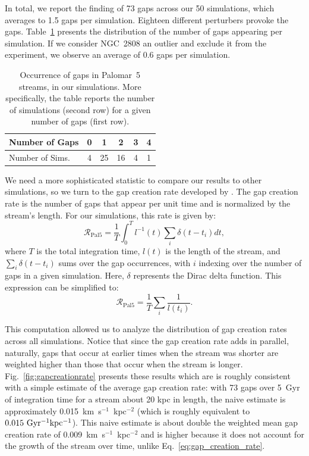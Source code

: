         In total, we report the finding of 73 gaps across our 50 simulations, which averages to 1.5 gaps per simulation. Eighteen different perturbers provoke the gaps. Table~\ref{table:gap_distribution} presents the distribution of the number of gaps appearing per simulation. If we consider NGC~2808 an outlier and exclude it from the experiment, we observe an average of 0.6 gaps per simulation.  

        \begin{table}[h]
            \centering
            \caption[Occurrence of gaps in Palomar~5 streams, in our simulations]{Occurrence of gaps in Palomar~5 streams, in our simulations. More specifically, the table reports the number of simulations (second row) for a given number of gaps (first row).}\label{table:gap_distribution}
            \begin{tabular}{|l|c|c|c|c|c|}
                \hline
                Number of Gaps & 0 & 1 & 2 & 3 & 4 \\
                \hline
                Number of Sims. & 4 & 25 & 16 & 4 & 1 \\
                \hline
            \end{tabular}
            \vspace{0.5cm}
        \end{table}

        We need a more sophisticated statistic to compare our results to other simulations, so we turn to the gap creation rate developed by \citet{2012ApJ...748...20C}. The gap creation rate is the number of gaps that appear per unit time and is normalized by the stream's length. For our simulations, this rate is given by: \begin{equation} \label{eq:gap_creation_rate} \mathcal{R}_{\mathrm{Pal 5}} =  \frac{1}{T}\int_{0}^T l^{-1}(t) \sum_i \delta(t-t_i) dt,\end{equation}where $T$ is the total integration time, $l(t)$ is the length of the stream, and $\sum_i \delta(t-t_i)$ sums over the gap occurrences, with $i$ indexing over the number of gaps in a given simulation. Here, $\delta$ represents the Dirac delta function. This expression can be simplified to:\begin{equation}\mathcal{R}_{\mathrm{Pal 5}} =  \frac{1}{T} \sum_i \frac{1}{l (t_i)}. \end{equation}
        
        This computation allowed us to analyze the distribution of gap creation rates across all simulations. Notice that since the gap creation rate adds in parallel, naturally, gaps that occur at earlier times when the stream was shorter are weighted higher than those that occur when the stream is longer. Fig.~\ref{fig:gapcreationrate} presents these results which are is roughly consistent with a simple estimate of the average gap creation rate: with 73 gaps over 5~Gyr of integration time for a stream about 20 kpc in length, the naive estimate is approximately 0.015~km~s$^{-1}$~kpc$^{-2} $ (which is roughly equivalent to $0.015~\rm{Gyr^{-1}kpc^{-1}}$). This naive estimate is about double the weighted mean gap creation rate of 0.009~km~s$^{-1}$~kpc$^{-2}$ and is higher because it does not account for the growth of the stream over time, unlike Eq.~\ref{eq:gap_creation_rate}.

